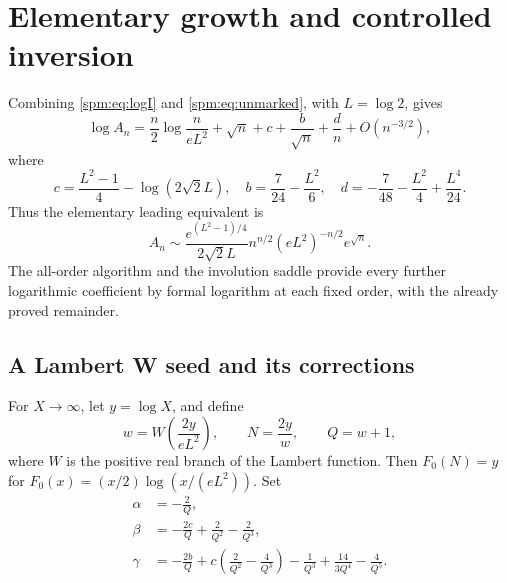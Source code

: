 \section{Elementary growth and controlled inversion}\label{spm:sec:inverse}
Combining \eqref{spm:eq:logI} and \eqref{spm:eq:unmarked}, with $L=\log2$, gives
\begin{equation}\label{spm:eq:logA}
 \log A_n=\frac n2\log\frac{n}{eL^2}+\sqrt n+c
                 +\frac b{\sqrt n}+\frac d n+O(n^{-3/2}),
\end{equation}
where
\begin{equation}\label{spm:eq:cbd}
 c=\frac{L^2-1}{4}-\log(2\sqrt2 L),\quad
 b=\frac7{24}-\frac{L^2}{6},\quad
 d=-\frac7{48}-\frac{L^2}{4}+\frac{L^4}{24}.
\end{equation}
Thus the elementary leading equivalent is
\begin{equation}\label{spm:eq:elementary}
 A_n\sim\frac{e^{(L^2-1)/4}}{2\sqrt2 L}
       n^{n/2}(eL^2)^{-n/2}e^{\sqrt n}.
\end{equation}
The all-order algorithm and the involution saddle provide every further logarithmic coefficient by formal logarithm at each fixed order, with the already proved remainder.

\subsection{A Lambert W seed and its corrections}
For $X\to\infty$, let $y=\log X$, and define
\begin{equation}\label{spm:eq:Wseed}
 w=W\left(\frac{2y}{eL^2}\right),\qquad N=\frac{2y}{w},\qquad Q=w+1,
\end{equation}
where $W$ is the positive real branch of the Lambert function. Then
$F_0(N)=y$ for $F_0(x)=(x/2)\log(x/(eL^2))$. Set
\begin{align}
 \alpha&=-\frac2Q,\label{spm:eq:alpha}\\
 \beta&=-\frac{2c}{Q}+\frac2{Q^2}-\frac2{Q^3},\label{spm:eq:beta}\\
 \gamma&=-\frac{2b}{Q}
 +c\left(\frac2{Q^2}-\frac4{Q^3}\right)
 -\frac1{Q^3}+\frac{14}{3Q^4}-\frac4{Q^5}.\label{spm:eq:gamma}
\end{align}

